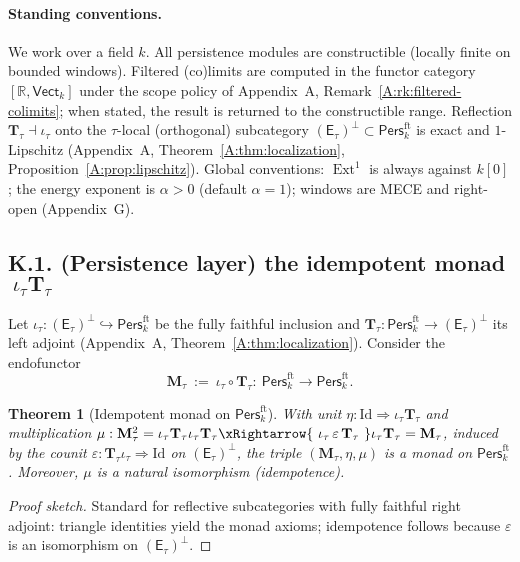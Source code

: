 \documentclass[11pt]{article}
\DeclareMathOperator{\Ext}{Ext}
\DeclareRobustCommand{\hyp}{\nobreakdash-}
\newcommand{\Pers}{\mathsf{Pers}}
\numberwithin{equation}{section}
\newtheorem{theorem}{Theorem}[section]
\theoremstyle{definition}
\begin{document}
\paragraph{Standing conventions.}
We work over a field \(k\).
All persistence modules are constructible (locally finite on bounded windows).
Filtered (co)limits are computed in the functor category \([\mathbb{R},\mathsf{Vect}_k]\) under the scope policy of Appendix~A, Remark~\ref{A:rk:filtered-colimits}; when stated, the result is returned to the constructible range.
Reflection \(\mathbf{T}_\tau\dashv \iota_\tau\) onto the \(\tau\)\hyp local (orthogonal) subcategory \((\mathsf{E}_\tau)^\perp\subset\Pers^{\mathrm{ft}}_k\) is exact and \(1\)\hyp Lipschitz (Appendix~A, Theorem~\ref{A:thm:localization}, Proposition~\ref{A:prop:lipschitz}).
Global conventions: \(\Ext^1\) is always against \(k[0]\); the energy exponent is \(\alpha>0\) (default \(\alpha=1\)); windows are MECE and right\hyp open (Appendix~G).

\subsection*{K.1. (Persistence layer) the idempotent monad \(\ \iota_\tau\mathbf{T}_\tau\)}
Let \(\iota_\tau:(\mathsf{E}_\tau)^\perp\hookrightarrow \Pers^{\mathrm{ft}}_k\) be the fully faithful inclusion and \(\mathbf{T}_\tau:\Pers^{\mathrm{ft}}_k\to(\mathsf{E}_\tau)^\perp\) its left adjoint (Appendix~A, Theorem~\ref{A:thm:localization}). Consider the endofunctor
\[
\mathbf{M}_\tau\ :=\ \iota_\tau\circ \mathbf{T}_\tau:\ \Pers^{\mathrm{ft}}_k\longrightarrow \Pers^{\mathrm{ft}}_k.
\]

\begin{theorem}[Idempotent monad on \(\Pers^{\mathrm{ft}}_k\)]\label{K:thm:monad}
With unit \(\eta:\mathrm{Id}\Rightarrow \iota_\tau\mathbf{T}_\tau\) and multiplication
\(\mu:\mathbf{M}_\tau^2=\iota_\tau\mathbf{T}_\tau\iota_\tau\mathbf{T}_\tau\xRightarrow{\ \iota_\tau\,\varepsilon\,\mathbf{T}_\tau\ }\iota_\tau\mathbf{T}_\tau=\mathbf{M}_\tau\),
induced by the counit \(\varepsilon:\mathbf{T}_\tau\iota_\tau\Rightarrow \mathrm{Id}\) on \((\mathsf{E}_\tau)^\perp\), the triple \((\mathbf{M}_\tau,\eta,\mu)\) is a monad on \(\Pers^{\mathrm{ft}}_k\).
Moreover, \(\mu\) is a natural isomorphism (idempotence).
\end{theorem}

\begin{proof}[Proof sketch]
Standard for reflective subcategories with fully faithful right adjoint: triangle identities yield the monad axioms; idempotence follows because \(\varepsilon\) is an isomorphism on \((\mathsf{E}_\tau)^\perp\).
\end{proof}
\end{document}
